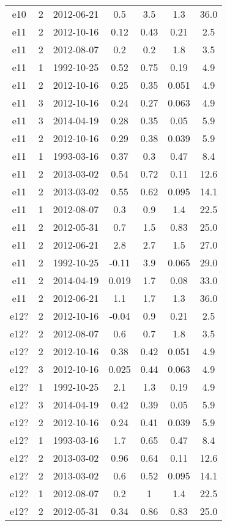 \begin{table*}[htp]
\begin{tabular}{ccccccc}
e10 & 2 & 2012-06-21 & 0.5 & 3.5 & 1.3 & 36.0 \\
e11 & 2 & 2012-10-16 & 0.12 & 0.43 & 0.21 & 2.5 \\
e11 & 2 & 2012-08-07 & 0.2 & 0.2 & 1.8 & 3.5 \\
e11 & 1 & 1992-10-25 & 0.52 & 0.75 & 0.19 & 4.9 \\
e11 & 2 & 2012-10-16 & 0.25 & 0.35 & 0.051 & 4.9 \\
e11 & 3 & 2012-10-16 & 0.24 & 0.27 & 0.063 & 4.9 \\
e11 & 3 & 2014-04-19 & 0.28 & 0.35 & 0.05 & 5.9 \\
e11 & 2 & 2012-10-16 & 0.29 & 0.38 & 0.039 & 5.9 \\
e11 & 1 & 1993-03-16 & 0.37 & 0.3 & 0.47 & 8.4 \\
e11 & 2 & 2013-03-02 & 0.54 & 0.72 & 0.11 & 12.6 \\
e11 & 2 & 2013-03-02 & 0.55 & 0.62 & 0.095 & 14.1 \\
e11 & 1 & 2012-08-07 & 0.3 & 0.9 & 1.4 & 22.5 \\
e11 & 2 & 2012-05-31 & 0.7 & 1.5 & 0.83 & 25.0 \\
e11 & 2 & 2012-06-21 & 2.8 & 2.7 & 1.5 & 27.0 \\
e11 & 2 & 1992-10-25 & -0.11 & 3.9 & 0.065 & 29.0 \\
e11 & 2 & 2014-04-19 & 0.019 & 1.7 & 0.08 & 33.0 \\
e11 & 2 & 2012-06-21 & 1.1 & 1.7 & 1.3 & 36.0 \\
e12? & 2 & 2012-10-16 & -0.04 & 0.9 & 0.21 & 2.5 \\
e12? & 2 & 2012-08-07 & 0.6 & 0.7 & 1.8 & 3.5 \\
e12? & 2 & 2012-10-16 & 0.38 & 0.42 & 0.051 & 4.9 \\
e12? & 3 & 2012-10-16 & 0.025 & 0.44 & 0.063 & 4.9 \\
e12? & 1 & 1992-10-25 & 2.1 & 1.3 & 0.19 & 4.9 \\
e12? & 3 & 2014-04-19 & 0.42 & 0.39 & 0.05 & 5.9 \\
e12? & 2 & 2012-10-16 & 0.24 & 0.41 & 0.039 & 5.9 \\
e12? & 1 & 1993-03-16 & 1.7 & 0.65 & 0.47 & 8.4 \\
e12? & 2 & 2013-03-02 & 0.96 & 0.64 & 0.11 & 12.6 \\
e12? & 2 & 2013-03-02 & 0.6 & 0.52 & 0.095 & 14.1 \\
e12? & 1 & 2012-08-07 & 0.2 & 1 & 1.4 & 22.5 \\
e12? & 2 & 2012-05-31 & 0.34 & 0.86 & 0.83 & 25.0 \\

\end{tabular}
\end{table*}
